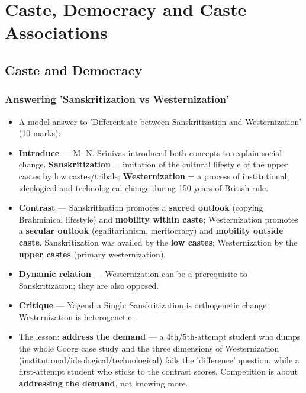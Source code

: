 \chapter{Caste, Democracy and Caste Associations}

\section{Caste and Democracy}

\subsection{Answering 'Sanskritization vs Westernization'}

\begin{ExampleBox}
\begin{itemize}
\item A model answer to 'Differentiate between Sanskritization and Westernization' (10 marks):
\item \textbf{Introduce} --- M. N. Srinivas introduced both concepts to explain social change. \textbf{Sanskritization} = imitation of the cultural lifestyle of the upper castes by low castes/tribals; \textbf{Westernization} = a process of institutional, ideological and technological change during 150 years of British rule.
\item \textbf{Contrast} --- Sanskritization promotes a \textbf{sacred outlook} (copying Brahminical lifestyle) and \textbf{mobility within caste}; Westernization promotes a \textbf{secular outlook} (egalitarianism, meritocracy) and \textbf{mobility outside caste}. Sanskritization was availed by the \textbf{low castes}; Westernization by the \textbf{upper castes} (primary westernization).
\item \textbf{Dynamic relation} --- Westernization can be a prerequisite to Sanskritization; they are also opposed.
\item \textbf{Critique} --- Yogendra Singh: Sanskritization is orthogenetic change, Westernization is heterogenetic.
\item The lesson: \textbf{address the demand} --- a 4th/5th-attempt student who dumps the whole Coorg case study and the three dimensions of Westernization (institutional/ideological/technological) fails the 'difference' question, while a first-attempt student who sticks to the contrast scores. Competition is about \textbf{addressing the demand}, not knowing more.
\end{itemize}
\end{ExampleBox}

